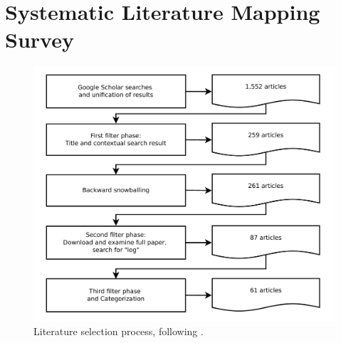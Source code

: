 

\section{Systematic Literature Mapping Survey}
\label{sec:survey}

\begin{figure}[htbp]
	\centering
	\includegraphics[width=\columnwidth, clip]{img/lit_survey.pdf}
	\caption{Literature selection process, following
	\cite{petersen2015guidelines}.}
	\label{fig:lit-survey}
\end{figure}

